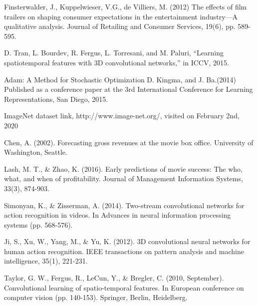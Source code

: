 {\begin{thebibliography}{25}
Finsterwalder, J., Kuppelwieser, V.G., de Villiers, M. (2012) The effects of film trailers on shaping consumer expectations in the entertainment industry—A qualitative analysis. Journal of Retailing and Consumer Services, 19(6), pp. 589-595.
 
D. Tran, L. Bourdev, R. Fergus, L. Torresani, and M. Paluri, “Learning spatiotemporal features with 3D convolutional networks,” in ICCV, 2015.

Adam: A Method for Stochastic Optimization
D. Kingma, and J. Ba.(2014) Published as a conference paper at the 3rd International Conference for Learning Representations, San Diego, 2015.

ImageNet dataset link, http://www.image-net.org/, visited on February 2nd, 2020 

Chen, A. (2002). Forecasting gross revenues at the movie box office. University of Washington, Seattle.
 
Lash, M. T., \& Zhao, K. (2016). Early predictions of movie success: The who, what, and when of profitability. Journal of Management Information Systems, 33(3), 874-903.
  
Simonyan, K., \& Zisserman, A. (2014). Two-stream convolutional networks for action recognition in videos. In Advances in neural information processing systems (pp. 568-576).


 


 
 
Ji, S., Xu, W., Yang, M., \& Yu, K. (2012). 3D convolutional neural networks for human action recognition. IEEE transactions on pattern analysis and machine intelligence, 35(1), 221-231.
 
Taylor, G. W., Fergus, R., LeCun, Y., \& Bregler, C. (2010, September). Convolutional learning of spatio-temporal features. In European conference on computer vision (pp. 140-153). Springer, Berlin, Heidelberg.

\end{thebibliography}
}